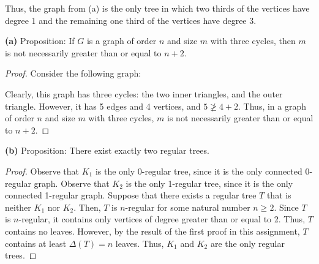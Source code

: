 \documentclass[12pt]{article}
\begin{document}
Thus, the graph from (a) is the only tree in which two thirds of the vertices have degree 1 and the remaining one third of the vertices have degree 3.

\newpage{}

{\bf (a)} Proposition: If $G$ is a graph of order $n$ and size $m$ with three cycles, then $m$ is not necessarily greater than or equal to $n+2$.
\begin{proof}
    Consider the following graph:
    \begin{center}
    \end{center}
    Clearly, this graph has three cycles: the two inner triangles, and the outer triangle.
    However, it has 5 edges and 4 vertices, and $5 \not \geq 4+2$.
    Thus, in a graph of order $n$ and size $m$ with three cycles, $m$ is not necessarily greater than or equal to $n+2$.
\end{proof}

{\bf (b)} Proposition: There exist exactly two regular trees.
\begin{proof}
    Observe that $K_1$ is the only 0-regular tree, since it is the only connected 0-regular graph. %
    Observe that $K_2$ is the only 1-regular tree, since it is the only connected 1-regular graph. %
    Suppose that there exists a regular tree $T$ that is neither $K_1$ nor $K_2$.
    Then, $T$ is $n$-regular for some natural number $n \geq 2$.
    Since $T$ is $n$-regular, it contains only vertices of degree greater than or equal to 2.
    Thus, $T$ contains no leaves.
    However, by the result of the first proof in this assignment, $T$ contains at least $\Delta(T) = n$ leaves.
    Thus, $K_1$ and $K_2$ are the only regular trees.
\end{proof}

\newpage{}

    
\end{document}
